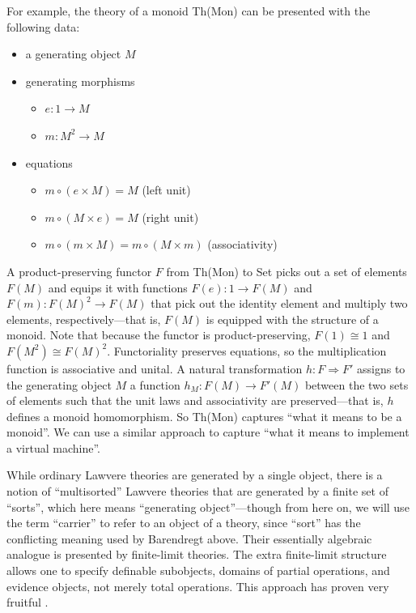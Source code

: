 \documentclass[11pt]{article}
\begin{document}
For example, the theory of a monoid Th(Mon) can be presented with the following data:
\begin{itemize}
    \item a generating object $M$
    \item generating morphisms
    \begin{itemize}
        \item $e:1 \to M$
        \item $m:M^2 \to M$
    \end{itemize}
    \item equations
    \begin{itemize}
        \item $m \circ (e \times M) = M$ (left unit)
        \item $m \circ (M \times e) = M$ (right unit)
        \item $m \circ (m \times M) = m \circ (M \times m)$ (associativity)
    \end{itemize}
\end{itemize}
A product-preserving functor $F$ from Th(Mon) to Set picks out a set of elements $F(M)$ and equips it with functions $F(e):1 \to F(M)$ and $F(m):F(M)^2 \to F(M)$ that pick out the identity element and multiply two elements, respectively---that is, $F(M)$ is equipped with the structure of a monoid.  Note that because the functor is product-preserving, $F(1) \cong 1$ and $F(M^2) \cong F(M)^2.$  Functoriality preserves equations, so the multiplication function is associative and unital.  A natural transformation $h: F \Rightarrow F'$ assigns to the generating object $M$ a function $h_M: F(M) \to F'(M)$ between the two sets of elements such that the unit laws and associativity are preserved---that is, $h$ defines a monoid homomorphism.  So Th(Mon) captures ``what it means to be a monoid''.  We can use a similar approach to capture ``what it means to implement a virtual machine''.

While ordinary Lawvere theories are generated by a single object, there is a notion of ``multisorted'' Lawvere theories \cite{TrimbleMultisorted} that are generated by a finite set of ``sorts'', which here means ``generating object''---though from here on, we will use the term ``carrier'' to refer to an object of a theory, since ``sort'' has the conflicting meaning used by Barendregt above.  Their essentially algebraic analogue is presented by finite-limit theories.  The extra finite-limit structure allows one to specify definable subobjects, domains of partial operations, and evidence objects, not merely total operations.  This approach has proven very fruitful \cite{AdamekRosickyVitale}.
\end{document}
